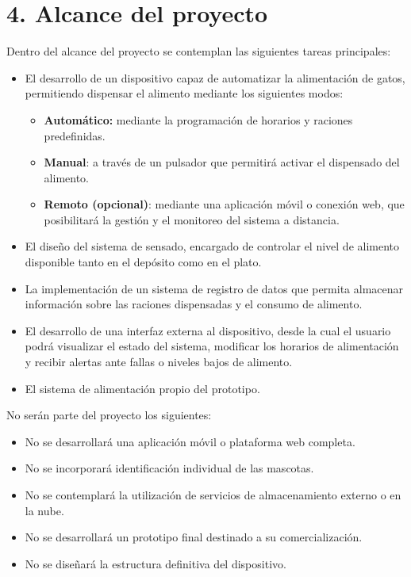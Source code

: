 \documentclass[
11pt, %
]{charter}
\begin{document}
\section{4. Alcance del proyecto}
\label{sec:alcance}

Dentro del alcance del proyecto se contemplan las siguientes tareas principales:
\begin{itemize}
	\item El desarrollo de un dispositivo capaz de automatizar la alimentación de gatos, permitiendo dispensar el alimento mediante los siguientes modos:
		\begin{itemize}
		\item \textbf{Automático:} mediante la programación de horarios y raciones predefinidas.
		\item \textbf{Manual}: a través de un pulsador que permitirá activar el dispensado del alimento.
		\item \textbf{Remoto (opcional)}: mediante una aplicación móvil o conexión web, que posibilitará la gestión y el monitoreo del sistema a distancia.
		\end{itemize}
	\item El diseño del sistema de sensado, encargado de controlar el nivel de alimento disponible tanto en el depósito como en el plato.
	\item La implementación de un sistema de registro de datos que permita almacenar información sobre las raciones dispensadas y el consumo de alimento.
	\item El desarrollo de una interfaz externa al dispositivo, desde la cual el usuario podrá visualizar el estado del sistema, modificar los horarios de alimentación y recibir alertas ante fallas o niveles bajos de alimento.
	\item El sistema de alimentación propio del prototipo.
	
\end{itemize}

No serán parte del proyecto los siguientes:

\begin{itemize}
	\item No se desarrollará una aplicación móvil o plataforma web completa.
	\item No se incorporará identificación individual de las mascotas.
	\item No se contemplará la utilización de servicios de almacenamiento externo o en la nube.
	\item No se desarrollará un prototipo final destinado a su comercialización.
	\item No se diseñará la estructura definitiva del dispositivo.
\end{itemize}
\end{document}
